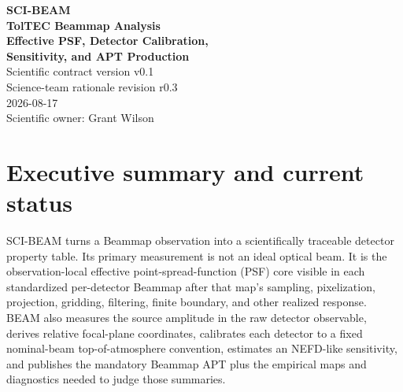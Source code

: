 \documentclass[11pt]{article}
\begin{document}
\hypersetup{pageanchor=false}

\begin{titlepage}
\centering\vspace*{0.55in}
{\Large\color{beamteal}\textbf{SCI-BEAM}}\\[0.18in]
{\huge\color{beamblue}\textbf{TolTEC Beammap Analysis}}\\[0.10in]
{\LARGE\color{beamblue}\textbf{Effective PSF, Detector Calibration,}}\\[0.04in]
{\LARGE\color{beamblue}\textbf{Sensitivity, and APT Production}}\\[0.38in]
{\large Scientific contract version v0.1}\\[0.06in]
{\large Science-team rationale revision r0.3}\\[0.08in]
{\large 2026-08-17}\\[0.46in]
\vfill {\large Scientific owner: Grant Wilson}
\end{titlepage}
\hypersetup{pageanchor=true}

\section*{Executive summary and current status}

SCI-BEAM turns a Beammap observation into a scientifically traceable detector
property table. Its primary measurement is not an ideal optical beam. It is
the observation-local effective point-spread-function (PSF) core visible in
each standardized per-detector Beammap after that map's sampling,
pixelization, projection, gridding, filtering, finite boundary, and other
realized response. BEAM also measures the source amplitude in the raw detector
observable, derives relative focal-plane coordinates, calibrates each detector
to a fixed nominal-beam top-of-atmosphere convention, estimates an NEFD-like
sensitivity, and publishes the mandatory Beammap APT plus the empirical maps
and diagnostics needed to judge those summaries.
\end{document}
